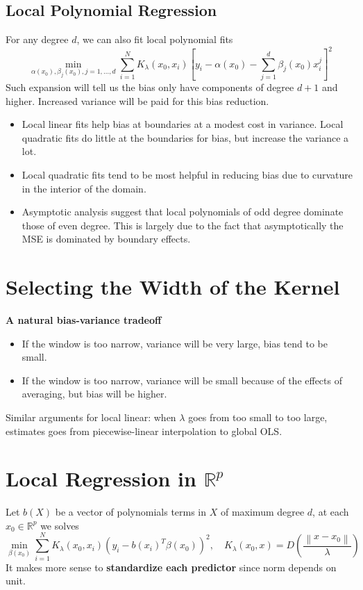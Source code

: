 \subsection{Local Polynomial Regression}
For any degree $d$, we can also fit local polynomial fits
\begin{equation*}
    \min _{\alpha\left(x_{0}\right), \beta_{j}\left(x_{0}\right), j=1, \ldots, d} 
    \sum_{i=1}^{N} K_{\lambda}\left(x_{0}, 
    x_{i}\right)\left[y_{i}-\alpha\left(x_{0}\right)-\sum_{j=1}^{d} 
    \beta_{j}\left(x_{0}\right) x_{i}^{j}\right]^{2}
\end{equation*}
Such expansion will tell us the bias only have components of degree $d+1$ and higher. 
Increased variance will be paid for this bias reduction. 
\begin{itemize}
\item Local linear fits help bias at boundaries at a modest cost in variance. 
Local quadratic fits do little at the boundaries for bias, but increase the variance a lot.
\item Local quadratic fits tend to be most helpful in reducing bias due to
curvature in the interior of the domain.
\item Asymptotic analysis suggest that local polynomials of odd degree
dominate those of even degree. This is largely due to the fact that
asymptotically the MSE is dominated by boundary effects.
\end{itemize}

\section{Selecting the Width of the Kernel}
\noindent\textbf{A natural bias-variance tradeoff}
\begin{itemize}
\item If the window is too narrow, variance will be very large, bias tend to be small. 
\item If the window is too narrow, variance will be small because of the effects of averaging, 
but bias will be higher. 
\end{itemize}
Similar arguments for local linear: when $\lambda$ goes from too small to too large, estimates
goes from piecewise-linear interpolation to global OLS. 

\section{Local Regression in $\mathbb{R}^p$}
Let $b(X)$ be a vector of polynomials terms in $X$ of maximum degree $d$, at each $x_0\in
\mathbb{R}^p$ we solves
\begin{equation*}
    \min _{\beta\left(x_{0}\right)} \sum_{i=1}^{N} K_{\lambda}\left(x_{0}, x_{i}\right)
    \left(y_{i}-b\left(x_{i}\right)^{T} \beta\left(x_{0}\right)\right)^{2}, \quad
    K_{\lambda}\left(x_{0}, x\right)=D\left(\frac{\left\|x-x_{0}\right\|}{\lambda}\right)
\end{equation*}
It makes more sense to \textbf{standardize each predictor} since norm depends on unit. 

